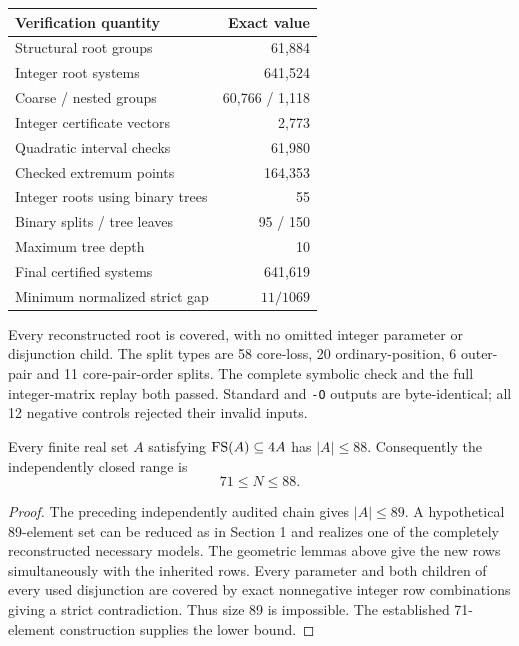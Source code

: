 \begin{center}
\begin{tabular}{lr}\toprule
Verification quantity&Exact value\\\midrule
Structural root groups&61,884\\
Integer root systems&641,524\\
Coarse / nested groups&60,766 / 1,118\\
Integer certificate vectors&2,773\\
Quadratic interval checks&61,980\\
Checked extremum points&164,353\\
Integer roots using binary trees&55\\
Binary splits / tree leaves&95 / 150\\
Maximum tree depth&10\\
Final certified systems&641,619\\
Minimum normalized strict gap&$11/1069$\\\bottomrule
\end{tabular}
\end{center}
Every reconstructed root is covered, with no omitted integer parameter or
disjunction child. The split types are 58 core-loss, 20 ordinary-position,
6 outer-pair and 11 core-pair-order splits.
The complete symbolic check and the full integer-matrix replay both
passed. Standard and \texttt{-O} outputs are byte-identical; all 12
negative controls rejected their invalid inputs.

\begin{theorem}
Every finite real set $A$ satisfying $\operatorname{FS}(A)\subseteq4A$ has
$|A|\le88$. Consequently the independently closed range is
\[
 \boxed{71\le N\le88}.
\]
\end{theorem}
\begin{proof}
The preceding independently audited chain gives $|A|\le89$.
A hypothetical 89-element set can be reduced as in Section 1 and realizes
one of the completely reconstructed necessary models. The geometric
lemmas above give the new rows simultaneously with the inherited rows.
Every parameter and both children of every used disjunction are covered
by exact nonnegative integer row combinations giving a strict
contradiction. Thus size 89 is impossible. The established 71-element
construction supplies the lower bound.
\end{proof}
